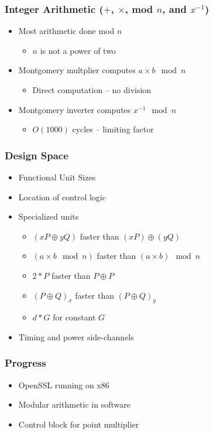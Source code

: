 \documentclass{beamer}
\begin{document}
\begin{frame}
  \frametitle{Integer Arithmetic ($+$, $\times$, mod $n$, and $x^{-1}$)}

  \begin{itemize}
  \item Most arithmetic done mod $n$
    \begin{itemize}
    \item $n$ is not a power of two
    \end{itemize}
  \item Montgomery multplier computes $a\times b\mod n$
    \begin{itemize}
    \item Direct computation -- no division
    \end{itemize}
  \item Montgomery inverter computes $x^{-1}\mod n$
    \begin{itemize}
    \item $O(1000)$ cycles -- limiting factor
    \end{itemize}
  \end{itemize}
\end{frame}

\begin{frame}
  \frametitle{Design Space}

  \begin{itemize}
  \item Functional Unit Sizes
  \item Location of control logic
  \item Specialized units
    \begin{itemize}
    \item $(xP \oplus yQ)$ faster than $(xP) \oplus (yQ)$
    \item $(a \times b \mod n)$ faster than $(a\times b)\mod n$
    \item $2*P$ faster than $P \oplus P$
    \item $(P \oplus Q)_x$ faster than $(P\oplus Q)_y$
    \item $d*G$ for constant $G$
    \end{itemize}
  \item Timing and power side-channels
  \end{itemize}
\end{frame}

\begin{frame}
  \frametitle{Progress}

  \begin{itemize}
  \item OpenSSL running on x86
  \item Modular arithmetic in software
  \item Control block for point multiplier
  \end{itemize}
\end{frame}
\end{document}
